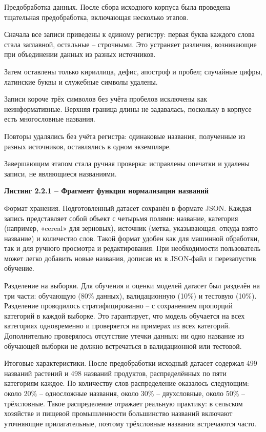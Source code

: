 Предобработка данных. После сбора исходного корпуса была проведена тщательная предобработка, включающая несколько этапов.

Сначала все записи приведены к единому регистру: первая буква каждого слова стала заглавной, остальные -- строчными. Это устраняет различия, возникающие при объединении данных из разных источников.

Затем оставлены только кириллица, дефис, апостроф и пробел; случайные цифры, латинские буквы и служебные символы удалены.

Записи короче трёх символов без учёта пробелов исключены как неинформативные. Верхняя граница длины не задавалась, поскольку в корпусе есть многословные названия.

Повторы удалялись без учёта регистра: одинаковые названия, полученные из разных источников, оставлялись в одном экземпляре.

Завершающим этапом стала ручная проверка: исправлены опечатки и удалены записи, не являющиеся названиями.

\textbf{Листинг 2.2.1 -- Фрагмент функции нормализации названий}



Формат хранения. Подготовленный датасет сохранён в формате JSON. Каждая запись представляет собой объект с четырьмя полями: название, категория (например, «cereal» для зерновых), источник (метка, указывающая, откуда взято название) и количество слов. Такой формат удобен как для машинной обработки, так и для ручного просмотра и редактирования. При необходимости пользователь может легко добавить новые названия, дописав их в JSON-файл и перезапустив обучение.

Разделение на выборки. Для обучения и оценки моделей датасет был разделён на три части: обучающую (80\% данных), валидационную (10\%) и тестовую (10\%). Разделение проводилось стратифицированно -- с сохранением пропорций категорий в каждой выборке. Это гарантирует, что модель обучается на всех категориях одновременно и проверяется на примерах из всех категорий. Дополнительно проверялось отсутствие утечки данных: ни одно название из обучающей выборки не должно встречаться в валидационной или тестовой.

Итоговые характеристики. После предобработки исходный датасет содержал 499 названий растений и 498 названий продуктов, распределённых по пяти категориям каждое. По количеству слов распределение оказалось следующим: около 20\% -- односложные названия, около 30\% -- двухсловные, около 50\% -- трёхсловные. Такое распределение отражает реальную практику: в сельском хозяйстве и пищевой промышленности большинство названий включают уточняющие прилагательные, поэтому трёхсловные названия встречаются часто.

